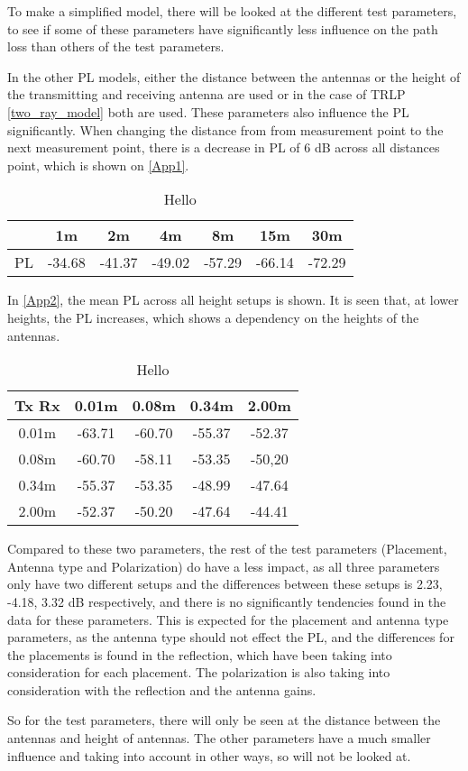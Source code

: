 To make a simplified model, there will be looked at the different test parameters, to see if some of these parameters have significantly less influence on the path loss than others of the test parameters.

In the other PL models, either the distance between the antennas or the height of the transmitting and receiving antenna are used or in the case of TRLP \eqref{two_ray_model} both are used. These parameters also influence the PL significantly. When changing the distance from from measurement point to the next measurement point, there is a decrease in PL of 6 dB across all distances point, which is shown on \autoref{App1}.

\begin{table}[!htbp]
\centering
\begin{tabular}{|c|c|c|c|c|c|c|}
\hline
   & 1m & 2m & 4m & 8m & 15m & 30m\\
\hline
PL & -34.68 & -41.37 & -49.02 & -57.29 & -66.14 & -72.29 \\
\hline
\end{tabular}
\label{App1}
\caption{Hello}
\end{table}



In \autoref{App2}, the mean PL across all height setups is shown. It is seen that, at lower heights, the PL increases, which shows a dependency on the heights of the antennas.

\begin{table}[!htbp]
\centering
\begin{tabular}{|c|c|c|c|c|}
\hline
Tx Rx & 0.01m & 0.08m & 0.34m & 2.00m \\
\hline
0.01m & -63.71 & -60.70 & -55.37 & -52.37\\
\hline
0.08m & -60.70 & -58.11 & -53.35 & -50,20\\
\hline
0.34m & -55.37 & -53.35 & -48.99 & -47.64\\
\hline
2.00m & -52.37 & -50.20 & -47.64 & -44.41\\
\hline
\end{tabular}
\caption{Hello}
\label{App2}
\end{table}

Compared to these two parameters, the rest of the test parameters (Placement, Antenna type and Polarization) do have a less impact, as all three parameters only have two different setups and the differences between these setups is 2.23, -4.18, 3.32 dB respectively, and there is no significantly tendencies found in the data for these parameters. This is expected for the placement and antenna type parameters, as the antenna type should not effect the PL, and the differences for the placements is found in the reflection, which have been taking into consideration for each placement. The polarization is also taking into consideration with the reflection and the antenna gains.

So for the test parameters, there will only be seen at the distance between the antennas and height of antennas. The other parameters have a much smaller influence and taking into account in other ways, so will not be looked at.
